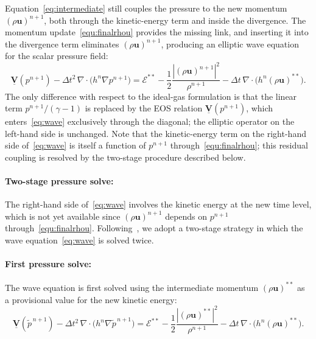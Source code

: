 \documentclass[a4paper,fleqn]{cas-sc}
\theoremstyle{definition}
\theoremstyle{remark}
\begin{document}
Equation~\eqref{eq:intermediate} still couples the pressure to the new momentum
$(\rho\mathbf{u})^{n+1}$, both through the kinetic-energy term and inside the
divergence. The momentum update~\eqref{equ:finalrhou} provides the missing link,
and inserting it into the divergence term eliminates $(\rho\mathbf{u})^{n+1}$, producing an elliptic wave equation for the scalar pressure field:
\begin{equation}
\label{eq:wave}
\underline{\mathbf{V}}(p^{n+1})
- \Delta t^{2}\,\nabla\!\cdot\!\big(h^{n}\nabla p^{n+1}\big)
= \mathcal{E}^{**} - \frac{1}{2}\frac{|(\rho\mathbf{u})^{n+1}|^{2}}{\rho^{n+1}}
- \Delta t\,\nabla\!\cdot\!\big(h^{n}(\rho\mathbf{u})^{**}\big).
\end{equation}
The only difference with respect to the ideal-gas formulation is that the linear
term $p^{n+1}/(\gamma-1)$ is replaced by the EOS relation
$\underline{\mathbf{V}}(p^{n+1})$, which enters~\eqref{eq:wave} exclusively
through the diagonal; the elliptic operator on the left-hand side is unchanged.
Note that the kinetic-energy term on the right-hand side of~\eqref{eq:wave} is
itself a function of $p^{n+1}$ through~\eqref{equ:finalrhou}; this residual
coupling is resolved by the two-stage procedure described below.

\paragraph{Two-stage pressure solve:}
The right-hand side of~\eqref{eq:wave} involves the kinetic energy at the new time
level, which is not yet available since $(\rho\mathbf{u})^{n+1}$ depends on
$p^{n+1}$ through~\eqref{equ:finalrhou}. Following~\cite{FVVEM}, we adopt a
two-stage strategy in which the wave equation~\eqref{eq:wave} is solved twice.

\paragraph{First pressure solve:}
The wave equation is first solved using the intermediate momentum
$(\rho\mathbf{u})^{**}$ as a provisional value for the new kinetic energy:
\begin{equation}
\label{eq:pressurefirst}
\underline{\mathbf{V}}(\tilde{p}^{\,n+1})
- \Delta t^{2}\,\nabla\!\cdot\!\big(h^{n}\nabla\tilde{p}^{\,n+1}\big)
= \mathcal{E}^{**} - \frac{1}{2}\frac{|(\rho\mathbf{u})^{**}|^{2}}{\rho^{n+1}}
- \Delta t\,\nabla\!\cdot\!\big(h^{n}(\rho\mathbf{u})^{**}\big).
\end{equation}
\end{document}
